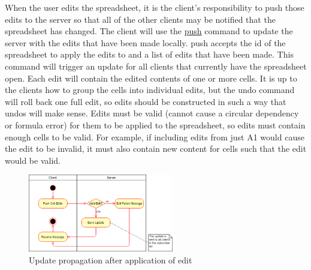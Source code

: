 When the user edits the spreadsheet, it is the client’s responsibility to push 
those edits to the server so that all of the other clients may be notified 
that the spreadsheet has changed. The client will use the \hyperref[sec:message:push]{push} command to 
update the server with the edits that have been made locally. push accepts 
the id of the spreadsheet to apply the edits to and a list of edits that have 
been made. This command will trigger an update for all clients that currently 
have the spreadsheet open. Each edit will contain the edited contents of one 
or more cells. It is up to the clients how to group the cells into individual 
edits, but the undo command will roll back one full edit, so edits should be 
constructed in such a way that undos will make sense. Edits must be valid 
(cannot cause a circular dependency or formula error) for them to be applied 
to the spreadsheet, so edits must contain enough cells to be valid. For 
example, if including edits from just A1 would cause the edit to be invalid, 
it must also contain new content for cells such that the edit would be valid.

\begin{figure}[H]
    \begin{center}
        \includegraphics[width=2.5in]{Figures/apply_edit_sprd.png}
        \caption{Update propagation after application of edit}
    \end{center}
\end{figure}